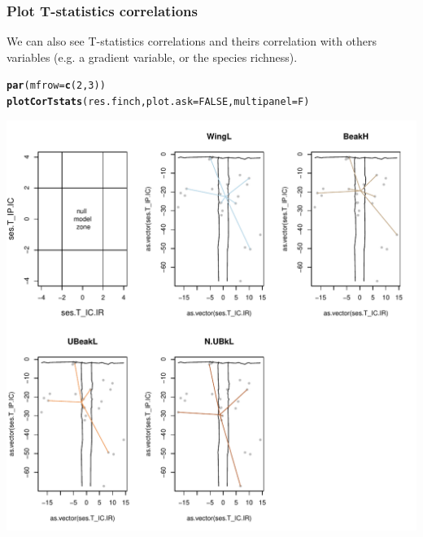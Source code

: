 \documentclass[12pt]{article}\usepackage[]{graphicx}\usepackage[]{color}
\makeatletter
\def\maxwidth{ %
  \ifdim\Gin@nat@width>\linewidth
    \linewidth
  \else
    \Gin@nat@width
  \fi
}
\newcommand{\hlnum}[1]{\textcolor[rgb]{0.686,0.059,0.569}{#1}}%
\newcommand{\hlstd}[1]{\textcolor[rgb]{0.345,0.345,0.345}{#1}}%
\newcommand{\hlkwc}[1]{\textcolor[rgb]{0.333,0.667,0.333}{#1}}%
\newcommand{\hlkwd}[1]{\textcolor[rgb]{0.737,0.353,0.396}{\textbf{#1}}}%
\newenvironment{kframe}{%
 \def\at@end@of@kframe{}%
 \ifinner\ifhmode%
  \def\at@end@of@kframe{\end{minipage}}%
  \begin{minipage}{\columnwidth}%
 \fi\fi%
 \def\FrameCommand##1{\hskip\@totalleftmargin \hskip-\fboxsep
 \colorbox{shadecolor}{##1}\hskip-\fboxsep
     \hskip-\linewidth \hskip-\@totalleftmargin \hskip\columnwidth}%
 \MakeFramed {\advance\hsize-\width
   \@totalleftmargin\z@ \linewidth\hsize
   \@setminipage}}%
 {\par\unskip\endMakeFramed%
 \at@end@of@kframe}
\newenvironment{knitrout}{}{} %
\makeatother
\begin{document}
  
\subsubsection{Plot T-statistics correlations}

We can also see T-statistics correlations and theirs correlation with others variables (e.g. a gradient variable, or the species richness).

\begin{knitrout}
\color{fgcolor}\begin{kframe}
\begin{alltt}
\hlkwd{par}\hlstd{(}\hlkwc{mfrow} \hlstd{=} \hlkwd{c}\hlstd{(}\hlnum{2}\hlstd{,}\hlnum{3}\hlstd{))}
\hlkwd{plotCorTstats}\hlstd{(res.finch,} \hlkwc{plot.ask} \hlstd{=} \hlnum{FALSE}\hlstd{,} \hlkwc{multipanel} \hlstd{= F)}
\end{alltt}
\end{kframe}
\includegraphics[width=\maxwidth]{figure/unnamed-chunk-40-1} 


\end{knitrout}
\end{document}
